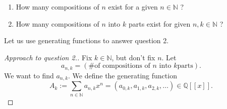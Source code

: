 \begin{enumerate}
\item How many compositions of $n$ exist for a given $n\in\mathbb{N}$ ?

\item How many compositions of $n$ into $k$ parts exist for given
$n,k\in\mathbb{N}$ ?
\end{enumerate}

Let us use generating functions to answer question 2.

\begin{proof}
[Approach to question 2.]Fix $k\in\mathbb{N}$, but don't fix $n$. Let
\begin{equation}
a_{n,k}=\left(  \text{\# of compositions of }n\text{ into }k\text{
parts}\right)  . \label{pf.thm.fps.comps.n-into-k-parts.1st.ank=}%
\end{equation}
We want to find $a_{n,k}$. We define the generating function%
\begin{equation}
A_{k}:=\sum_{n\in\mathbb{N}}a_{n,k}x^{n}=\left(  a_{0,k},a_{1,k}%
,a_{2,k},\ldots\right)  \in\mathbb{Q}\left[  \left[  x\right]  \right]  .
\label{pf.thm.fps.comps.n-into-k-parts.1st.Ak=}%
\end{equation}



\end{proof}
